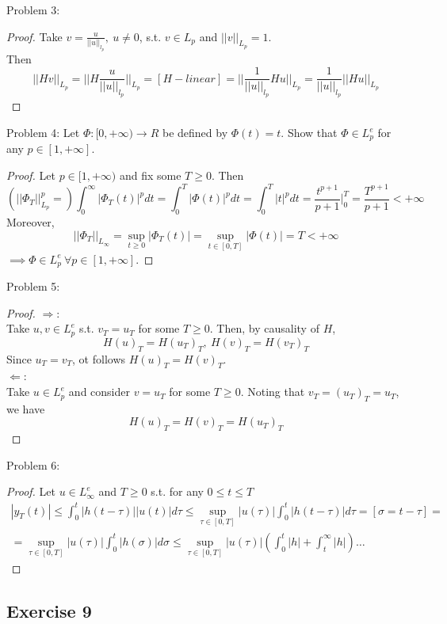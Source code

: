 Problem 3:
\begin{proof}
    Take $v=\frac{u}{||u||_{l_p}}, \ u \neq 0$, s.t. $v \in L_p$ and $||v||_{L_p}=1$.\\
    Then
    $$||Hv||_{L_p}=||H\frac{u}{||u||_{l_p}}||_{L_p}=[H - linear]=||\frac{1}{||u||_{l_p}}Hu||_{L_p}=\frac{1}{||u||_{l_p}}||Hu||_{L_p}$$
\end{proof}

Problem 4:
Let $\Phi:[0,+\infty) \rightarrow R$ be defined by $\Phi(t)=t$. Show that $\Phi \in L^e_p$ for any $p \in [1, +\infty]$.
\begin{proof}
    Let $p \in [1, +\infty)$ and fix some $T \ge 0$. Then
    $$(||\Phi_T||^p_{L_p}=)\int^{\infty}_0|\Phi_T(t)|^pdt = \int^T_0|\Phi(t)|^pdt = \int^T_0|t|^pdt = \frac{t^{p+1}}{p+1}|^T_0 = \frac{T^{p+1}}{p+1} < +\infty$$
    Moreover, 
    $$||\Phi_T||_{L_{\infty}}=\sup_{t \ge 0} |\Phi_T(t)|=\sup_{t \in [0,T]} |\Phi(t)|=T < +\infty$$
    $\implies \Phi \in L^e_p \ \forall p \in [1,+\infty]$.
\end{proof}

Problem 5:
\begin{proof}
    $\Longrightarrow$: \\
    Take $u,v \in L^e_p$ s.t. $v_T=u_T$ for some $T \ge 0$. Then, by causality of $H$,
    $$H(u)_T = H(u_T)_T, \ H(v)_T = H(v_T)_T$$
    Since $u_T=v_T$, ot follows $H(u)_T = H(v)_T$.\\
    $\Longleftarrow$: \\
    Take $u \in L^e_p$ and consider $v=u_T$ for some $T \ge 0$. Noting that $v_T = (u_T)_T=u_T$, we have
    $$H(u)_T=H(v)_T=H(u_T)_T$$
\end{proof}

Problem 6:
\begin{proof}
    Let $u \in L^e_{\infty}$ and $T \ge 0$ s.t. for any $0 \le t \le T$
    \begin{multline*} 
        |y_T(t)| \le \int_0^t |h(t-\tau)||u(t)|d\tau \le \sup_{\tau \in [0,T]} |u(\tau)| \int^t_0|h(t-\tau)|d\tau = [\sigma = t - \tau]  = \\ = \sup_{\tau \in [0,T]} |u(\tau)| \int^t_0|h(\sigma)|d\sigma \le \sup_{\tau \in [0,T]} |u(\tau)|( \int^t_0|h|+\int^{\infty}_t|h|) \dots
    \end{multline*}
\end{proof}

\subsection{Exercise 9}

